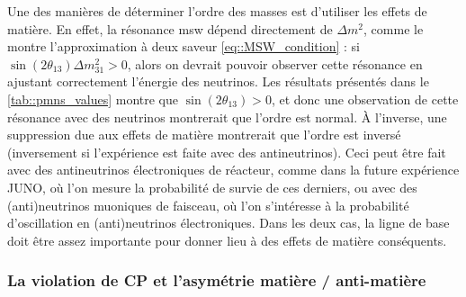         Une des manières de déterminer l'ordre des masses est d'utiliser les effets de matière. En effet, la résonance \gls{msw} dépend directement de $\Delta m^2$, comme le montre l'approximation à deux saveur \eqref{eq::MSW_condition} : si $\sin(2\theta_{13})\Delta m^2_{31} > 0$, alors on devrait pouvoir observer cette résonance en ajustant correctement l'énergie des neutrinos. Les résultats présentés dans le \autoref{tab::pmns_values} montre que $\sin(2\theta_{13}) > 0$, et donc une observation de cette résonance avec des neutrinos montrerait que l'ordre est normal. À l'inverse, une suppression due aux effets de matière montrerait que l'ordre est inversé (inversement si l'expérience est faite avec des antineutrinos). Ceci peut être fait avec des antineutrinos électroniques de réacteur, comme dans la future expérience JUNO\cite{Yang2015}, où l'on mesure la probabilité de survie de ces derniers, ou avec des (anti)neutrinos muoniques de faisceau, où l'on s'intéresse à la probabilité d'oscillation en (anti)neutrinos électroniques. Dans les deux cas, la ligne de base doit être assez importante pour donner lieu à des effets de matière conséquents.
        

      \subsubsection{La violation de CP et l'asymétrie matière / anti-matière}

